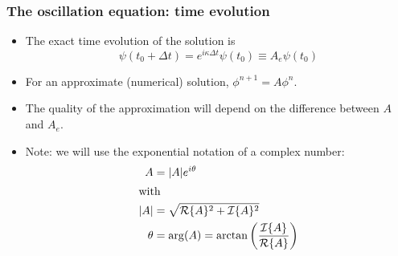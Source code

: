 \documentclass[aspectratio=43,9pt]{beamer}
\begin{document}
\begin{frame}
	\frametitle{The oscillation equation: time evolution}
	\begin{itemize}
		\item The exact time evolution of the solution is
			\begin{equation*}
				\psi (t_0 +\Delta t) = e^{i \kappa \Delta t} \psi (t_0) \equiv A_e \psi (t_0)
			\end{equation*}\vspace*{2ex}
		\item For an approximate (numerical) solution, $\phi^{n+1} = A \phi^n$.\vspace*{3ex}
		\item The quality of the approximation will depend on the difference between $A$ and $A_e$.\vspace*{3ex}
		\item Note: we will use the exponential notation of a complex number:
			\begin{align*}
				A & =|A| e^{i \theta}\\
			\intertext{with}
				| A | & = \sqrt{ \mathcal R \{ A \}^2 + \mathcal I \{ A \}^2 } \\
				\theta & = \arg(A)=\arctan \left(\frac{{\cal I}\{ A \}}{{\cal R}\{ A \}}\right)
			\end{align*}
	\end{itemize}
\end{frame}
%
%
%
\end{document}
